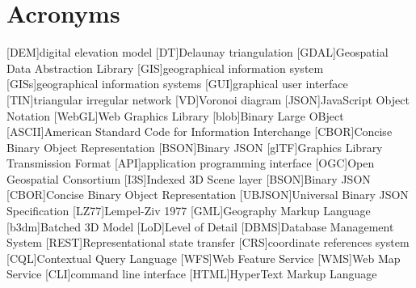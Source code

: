 
\chapter*{Acronyms}

\begin{acronym}[UML]
  [DEM]{digital elevation model}
  [DT]{Delaunay triangulation}
  [GDAL]{Geospatial Data Abstraction Library}
  [GIS]{geographical information system}
  [GISs]{geographical information systems}
  [GUI]{graphical user interface}
  [TIN]{triangular irregular network}
  [VD]{Voronoi diagram}
  [JSON]{JavaScript Object Notation}
  [WebGL]{Web Graphics Library}
  [blob]{Binary Large OBject}
  [ASCII]{American Standard Code for Information Interchange}
  [CBOR]{Concise Binary Object Representation}
  [BSON]{Binary JSON}
  [glTF]{Graphics Library Transmission Format}
  [API]{application programming interface}
  [OGC]{Open Geospatial Consortium}
  [I3S]{Indexed 3D Scene layer}
  [BSON]{Binary JSON}
  [CBOR]{Concise Binary Object Representation}
  [UBJSON]{Universal Binary JSON Specification}
  [LZ77]{Lempel-Ziv 1977}
  [GML]{Geography Markup Language}
  [b3dm]{Batched 3D Model}
  [LoD]{Level of Detail}
  [DBMS]{Database Management System}
  [REST]{Representational state transfer}
  [CRS]{coordinate references system}
  [CQL]{Contextual Query Language}
  [WFS]{Web Feature Service}
  [WMS]{Web Map Service}
  [CLI]{command line interface}
  [HTML]{HyperText Markup Language}
\end{acronym}
